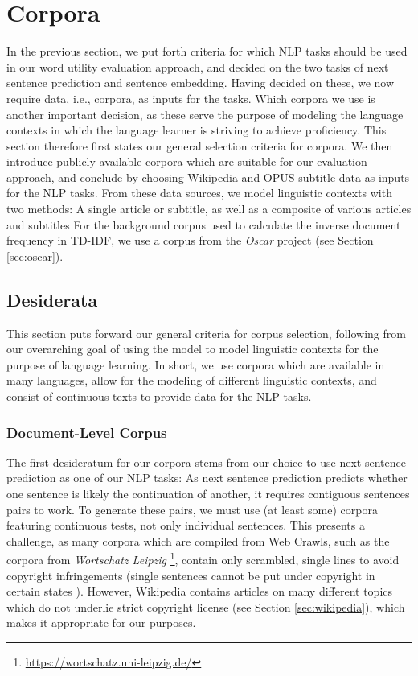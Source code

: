 \section{Corpora}
In the previous section, we put forth criteria for which NLP tasks should be used in our word utility evaluation approach, and decided on the two tasks of next sentence prediction and sentence embedding.
Having decided on these, we now require data, i.e., corpora, as inputs for the tasks.
Which corpora we use is another important decision, as these serve the purpose of modeling the language contexts in which the language learner is striving to achieve proficiency.
This section therefore first states our general selection criteria for corpora.
We then introduce publicly available corpora which are suitable for our evaluation approach, and conclude by choosing Wikipedia and OPUS subtitle data as inputs for the NLP tasks.
From these data sources, we model linguistic contexts with two methods:
A single article or subtitle, as well as a composite of various articles and subtitles
For the background corpus used to calculate the inverse document frequency in TD-IDF, we use a corpus from the \textit{Oscar} project (see Section \ref{sec:oscar}).

\subsection{Desiderata}
This section puts forward our general criteria for corpus selection, following from our overarching goal of using the model to model linguistic contexts for the purpose of language learning.
In short, we use corpora which are available in many languages, allow for the modeling of different linguistic contexts, and consist of continuous texts to provide data for the NLP tasks.

\subsubsection{Document-Level Corpus} \label{sec:document-level-corpus}
The first desideratum for our corpora stems from our choice to use next sentence prediction as one of our NLP tasks:
As next sentence prediction predicts whether one sentence is likely the continuation of another, it requires contiguous sentences pairs to work.
To generate these pairs, we must use (at least some) corpora featuring continuous tests, not only individual sentences.
This presents a challenge, as many corpora which are compiled from Web Crawls, such as the corpora from \textit{Wortschatz Leipzig} \footnote{\url{https://wortschatz.uni-leipzig.de/}}, contain only scrambled, single lines to avoid copyright infringements (single sentences cannot be put under copyright in certain states \cite{goldhahnBuildingLargeMonolingual2012}).
However, Wikipedia contains articles on many different topics which do not underlie strict copyright license (see Section \ref{sec:wikipedia}), which makes it appropriate for our purposes.

